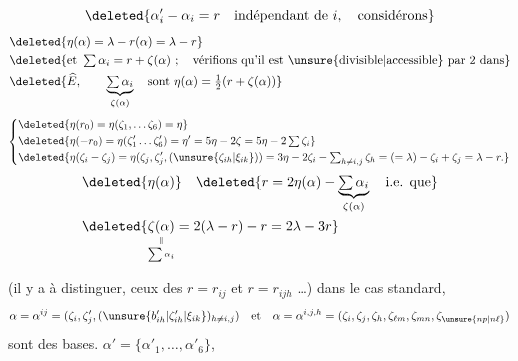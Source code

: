  
\[
\deleted{\alpha'_i-\alpha_i=r\quad \text{indépendant de }i, \quad\text{considérons}}
\]
\[
\begin{aligned}
&\deleted{\eta(\alpha)=\lambda-r(\alpha)=\lambda-r}\\
&\deleted{\text{et }\textstyle\sum\alpha_i=r+\zeta(\alpha)\ ;\quad\text{vérifions qu'il est \unsure{divisible|accessible} par 2 dans}}\\
&\deleted{\widehat E,\qquad\underbrace{\textstyle\sum\alpha_i}_{\zeta(\alpha)}\quad
 \text{sont }\eta(\alpha)=\tfrac12(r+\zeta(\alpha))}
\end{aligned}
\]
\[
\left\{\begin{aligned}
&\deleted{\eta(r_0)=\eta(\zeta_1,\ldots\zeta_6)=\eta}\\
&\deleted{\eta(-r_0)=\eta(\zeta'_1\ldots\zeta'_6)=\eta'=5\eta-2\zeta=5\eta-2\textstyle\sum\zeta_i}\\
&\deleted{\eta(\zeta_i-\zeta_j)=\eta(\zeta_j,\zeta'_j,(\unsure{\zeta_{ih}|\xi_{ik}}))=3\eta-2\zeta_i-\textstyle\sum_{h\ne i,j}\zeta_h=(=\lambda)-\zeta_i+\zeta_j=\lambda-r.}
\end{aligned}\right.
\]
\[
\begin{aligned}
&\deleted{\eta(\alpha)}\quad\deleted{r=2\eta(\alpha)-\underbrace{\textstyle\sum\alpha_i}_{\zeta(\alpha)}\quad\text{i.e. que}}\\
&\deleted{\underset{\scriptscriptstyle\sum\alpha_i}{\underset{\scriptscriptstyle\Vert}{\zeta(\alpha)}}=2(\lambda-r)-r=2\lambda-3r}
\end{aligned}
\]

(il y a   à distinguer, ceux des $r=r_{ij}$ et $r=r_{ijh}$ \ldots) dans le cas standard,
\[
\alpha=\alpha^{ij}=(\zeta_i,\zeta'_j,(\unsure{b'_{ih}|\zeta'_{ih}|\xi_{ik}})_{h\ne i,j})\quad\text{et}\quad
\alpha=\alpha^{i,j,h}=(\zeta_i,\zeta_j,\zeta_h,\zeta_{\ell m},\zeta_{mn},\zeta_{\unsure{np|n\ell}})
\]
sont des bases.     $\alpha'=\{\alpha'_1,\ldots,\alpha'_6\}$,


